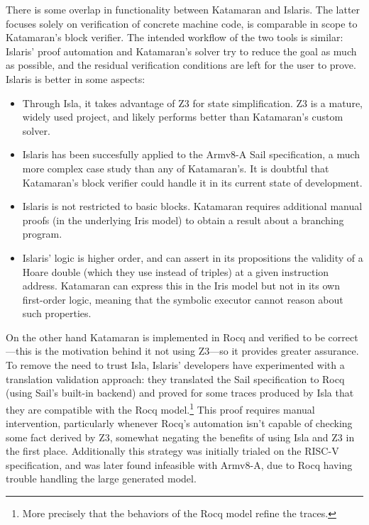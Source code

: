 There is some overlap in functionality between Katamaran and Islaris. The latter focuses solely on verification of concrete machine code, \ie is comparable in scope to Katamaran's block verifier. The intended workflow of the two tools is similar: Islaris' proof automation and Katamaran's solver try to reduce the goal as much as possible, and the residual verification conditions are left for the user to prove. Islaris is better in some aspects:
\begin{itemize}
\item Through Isla, it takes advantage of Z3 for state simplification. Z3 is a mature, widely used project, and likely performs better than Katamaran's custom solver.
\item Islaris has been succesfully applied to the Armv8-A Sail specification, a much more complex case study than any of Katamaran's. It is doubtful that Katamaran's block verifier could handle it in its current state of development.
\item Islaris is not restricted to basic blocks. Katamaran requires additional manual proofs (in the underlying Iris model) to obtain a result about a branching program.
\item Islaris' logic is higher order, and can assert in its propositions the validity of a Hoare double (which they use instead of triples) at a given instruction address. Katamaran can express this in the Iris model but not in its own first-order logic, meaning that the symbolic executor cannot reason about such properties.
\end{itemize}

On the other hand Katamaran is implemented in Rocq and verified to be correct---this is the motivation behind it not using Z3---so it provides greater assurance. To remove the need to trust Isla, Islaris' developers have experimented with a translation validation approach: they translated the Sail specification to Rocq (using Sail's built-in backend) and proved for some traces produced by Isla that they are compatible with the Rocq model.\footnote{More precisely that the behaviors of the Rocq model refine the traces.} This proof requires manual intervention, particularly whenever Rocq's automation isn't capable of checking some fact derived by Z3, somewhat negating the benefits of using Isla and Z3 in the first place. Additionally this strategy was initially trialed on the RISC-V specification, and was later found infeasible with Armv8-A, due to Rocq having trouble handling the large generated model.

